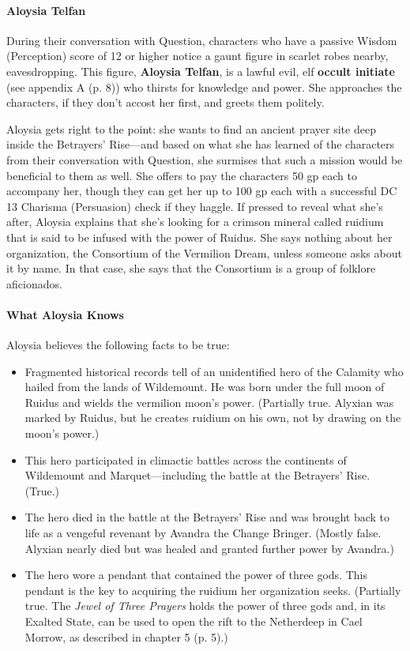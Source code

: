 \documentclass[a4paper, 11pt, bg=full, twocolumn, nooutline]{dndbook}
\begin{document}
\paragraph{Aloysia Telfan}

During their conversation with Question, characters who have a passive Wisdom (Perception) score of 12 or higher notice a gaunt figure in scarlet robes nearby, eavesdropping. This figure, \textbf{Aloysia Telfan}, is a lawful evil, elf \textbf{occult initiate} (see appendix A (p. 8)) who thirsts for knowledge and power. She approaches the characters, if they don't accost her first, and greets them politely.

Aloysia gets right to the point: she wants to find an ancient prayer site deep inside the Betrayers' Rise---and based on what she has learned of the characters from their conversation with Question, she surmises that such a mission would be beneficial to them as well. She offers to pay the characters 50 gp each to accompany her, though they can get her up to 100 gp each with a successful DC 13 Charisma (Persuasion) check if they haggle. If pressed to reveal what she's after, Aloysia explains that she's looking for a crimson mineral called ruidium that is said to be infused with the power of Ruidus. She says nothing about her organization, the Consortium of the Vermilion Dream, unless someone asks about it by name. In that case, she says that the Consortium is a group of folklore aficionados.

\paragraph{What Aloysia Knows}

Aloysia believes the following facts to be true:

\begin{itemize}
\item Fragmented historical records tell of an unidentified hero of the Calamity who hailed from the lands of Wildemount. He was born under the full moon of Ruidus and wields the vermilion moon's power. (Partially true. Alyxian was marked by Ruidus, but he creates ruidium on his own, not by drawing on the moon's power.)
\item This hero participated in climactic battles across the continents of Wildemount and Marquet---including the battle at the Betrayers' Rise. (True.)
\item The hero died in the battle at the Betrayers' Rise and was brought back to life as a vengeful revenant by Avandra the Change Bringer. (Mostly false. Alyxian nearly died but was healed and granted further power by Avandra.)
\item The hero wore a pendant that contained the power of three gods. This pendant is the key to acquiring the ruidium her organization seeks. (Partially true. The \textit{Jewel of Three Prayers} holds the power of three gods and, in its Exalted State, can be used to open the rift to the Netherdeep in Cael Morrow, as described in chapter 5 (p. 5).)
\end{itemize}
\end{document}
